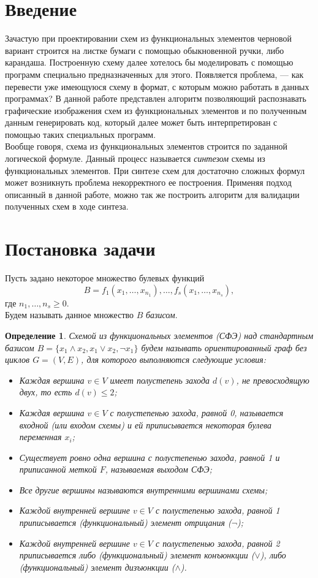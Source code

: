 \documentclass[makeidx, a4paper, 14pt]{extarticle}
\newtheorem{definition}{Определение}
\begin{document}
\section{Введение}
Зачастую при проектировании схем из функциональных элементов черновой вариант строится на листке бумаги с помощью обыкновенной ручки, либо карандаша.
Построенную схему далее хотелось бы моделировать с помощью программ специально предназначенных для этого. Появляется проблема, --- как перевести уже
имеющуюся схему в формат, с которым можно работать в данных программах? В данной работе представлен алгоритм позволяющий распознавать графические изображения
схем из функциональных элементов и по полученным данным генерировать код, который далее может быть интерпретирован с помощью таких специальных программ. \\
Вообще говоря, схема из функциональных элементов строится по заданной логической формуле. Данный процесс называется \emph{синтезом} схемы из функциональных элементов.
При синтезе схем для достаточно сложных формул может возникнуть проблема некорректного ее построения. Применяя подход описанный в данной работе, можно так же построить
алгоритм для валидации полученных схем в ходе синтеза.

\section{Постановка задачи}
Пусть задано некоторое множество булевых функций \[{B = {f_1(x_1, \dots, x_{n_1}), \dots, f_s(x_1, \dots, x_{n_s})}}, \]
где $n_1, \dots, n_s \ge 0$. \\ Будем называть данное множество $B$ \emph{базисом}.

\begin{definition}
    Схемой из функциональных элементов (СФЭ) над стандартным базисом ${B = \{x_1 \wedge x_2, x_1 \vee x_2, \neg{x_1}\}}$
    будем называть ориентированный граф без циклов ${G=(V, E)}$, для которого выполняются следующие условия:
    \begin{itemize}
        \item Каждая вершина $v \in V$ имеет полустепень захода $d(v)$, не превосходящую двух, то есть ${d(v) \le 2}$;
        \item Каждая вершина $v \in V$ с полустепенью захода, равной 0, называется входной (или входом схемы) и ей приписывается некоторая булева переменная $x_i$;
        \item Существует ровно одна вершина с полустепенью захода, равной 1 и приписанной меткой $F$, называемая выходом СФЭ;
        \item Все другие вершины называются внутренними вершинами схемы;
        \item Каждой внутренней вершине $v \in V$ с полустепенью захода, равной 1 приписывается (функциональный) элемент отрицания ($\neg$);
        \item Каждой внутренней вершине $v \in V$ с полустепенью захода, равной 2 приписывается либо (функциональный) элемент конъюнкции ($\vee$),
        либо (функциональный) элемент дизъюнкции ($\wedge$).
    \end{itemize}
\end{definition}
\end{document}
